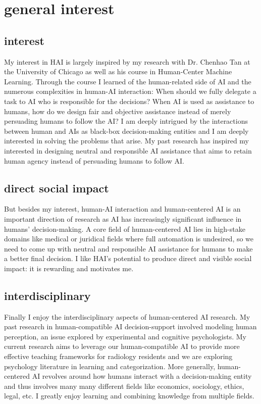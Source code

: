 
\section{general interest}



\subsection{interest}
My interest in HAI is largely inspired by my research with Dr. Chenhao Tan at the University of Chicago as well as his course in Human-Center Machine Learning. 
Through the course I learned of the human-related side of AI and the numerous complexities in human-AI interaction: When should we fully delegate a task to AI who is responsible for the decisions? When AI is used as assistance to humans, how do we design fair and objective assistance instead of merely persuading humans to follow the AI? 
I am deeply intrigued by the interactions between human and AIs as black-box decision-making entities and I am deeply interested in solving the problems that arise. 
My past research has inspired my interested in designing neutral and responsible AI assistance that aims to retain human agency instead of persuading humans to follow AI.

\subsection{direct social impact}
But besides my interest, human-AI interaction and human-centered AI is an important direction of research as AI has increasingly significant influence in humans' decision-making. A core field of human-centered AI lies in high-stake domains like medical or juridical fields where full automation is undesired, so we need to come up with neutral and responsible AI assistance for humans to make a better final decision. 
I like HAI's potential to produce direct and visible social impact: it is rewarding and motivates me.


\subsection{interdisciplinary}
Finally I enjoy the interdisciplinary aspects of human-centered AI research. My past research in human-compatible AI decision-support involved modeling human perception, an issue explored by experimental and cognitive psychologists. My current research aims to leverage our human-compatible AI to provide more effective teaching frameworks for radiology residents and we are exploring psychology literature in learning and categorization. More generally, human-centered AI revolves around how humans interact with a decision-making entity and thus involves many many different fields like economics, sociology, ethics, legal, etc. I greatly enjoy learning and combining knowledge from multiple fields. 




